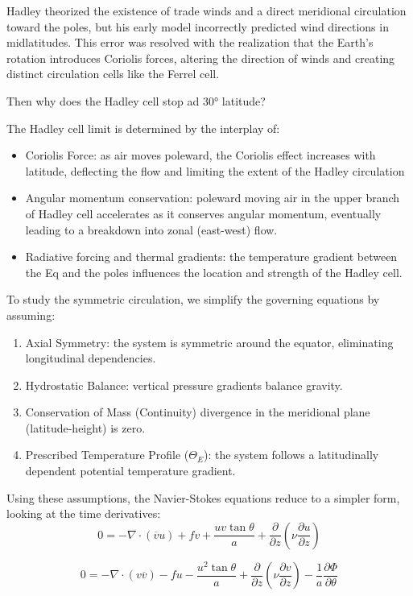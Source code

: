 Hadley theorized the existence of trade winds and a direct meridional circulation toward the poles, but his early model incorrectly predicted wind directions in midlatitudes. This error was resolved with the realization that the Earth’s rotation introduces Coriolis forces, altering the direction of winds and creating distinct circulation cells like the Ferrel cell.

Then why does the Hadley cell stop ad 30° latitude?

The Hadley cell limit is determined by the interplay of:
\begin{itemize}
	\item Coriolis Force: as air moves poleward, the Coriolis effect increases with latitude, deflecting the flow and limiting the extent of the Hadley circulation
	\item Angular momentum conservation: poleward moving air in the upper branch of Hadley cell accelerates as it conserves angular momentum, eventually leading to a breakdown into zonal (east-west) flow.
	\item Radiative forcing and thermal gradients: the temperature gradient between the Eq and the poles influences the location and strength of the Hadley cell.
\end{itemize}

To study the symmetric circulation, we simplify the governing equations by assuming:
\begin{enumerate}
	\item Axial Symmetry: the system is symmetric around the equator, eliminating longitudinal dependencies.
	\item Hydrostatic Balance: vertical pressure gradients balance gravity.
	\item Conservation of Mass (Continuity) divergence in the meridional plane (latitude-height) is zero.
	\item Prescribed Temperature Profile ($\Theta_E$): the system follows a latitudinally dependent potential temperature gradient.
\end{enumerate}
Using these assumptions, the Navier-Stokes equations reduce to a simpler form, looking at the time derivatives:
\[
	0 = -\nabla \cdot ({\overline{v}}{u}) + f v
	+ \frac{u v \tan \theta}{a}
	+ \frac{\partial}{\partial z} \left( \nu \frac{\partial u}{\partial z} \right)
\]

\[
	0 = -\nabla \cdot (v \overline{v}) - f u
	- \frac{u^2 \tan \theta}{a}
	+ \frac{\partial}{\partial z} \left( \nu \frac{\partial v}{\partial z} \right)
	- \frac{1}{a} \frac{\partial \Phi}{\partial \theta}
\]

